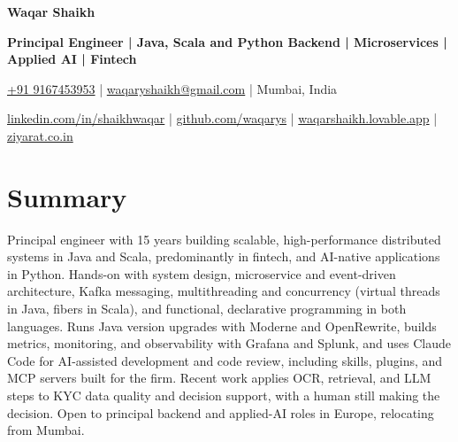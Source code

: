 \documentclass[10pt,a4paper]{article}
\newcommand{\fs}{9.5}\newcommand{\ld}{11.0}
\begin{document}
\raggedright\fontsize{\fs}{\ld}\selectfont

{\fontsize{20}{23}\selectfont\bfseries Waqar Shaikh}\par\vspace{1pt}
{\color{acc}\bfseries Principal Engineer | Java, Scala and Python Backend | Microservices | Applied AI | Fintech}\par
\href{tel:+919167453953}{+91 9167453953} | \href{mailto:waqaryshaikh@gmail.com}{waqaryshaikh@gmail.com} | Mumbai, India\par
\href{https://www.linkedin.com/in/shaikhwaqar}{linkedin.com/in/shaikhwaqar} | \href{https://github.com/waqarys}{github.com/waqarys} | \href{https://waqarshaikh.lovable.app/}{waqarshaikh.lovable.app} | \href{https://ziyarat.co.in}{ziyarat.co.in}\par

\section*{Summary}
Principal engineer with 15 years building scalable, high-performance distributed systems in Java and Scala, predominantly in fintech, and AI-native applications in Python. Hands-on with system design, microservice and event-driven architecture, Kafka messaging, multithreading and concurrency (virtual threads in Java, fibers in Scala), and functional, declarative programming in both languages. Runs Java version upgrades with Moderne and OpenRewrite, builds metrics, monitoring, and observability with Grafana and Splunk, and uses Claude Code for AI-assisted development and code review, including skills, plugins, and MCP servers built for the firm. Recent work applies OCR, retrieval, and LLM steps to KYC data quality and decision support, with a human still making the decision. Open to principal backend and applied-AI roles in Europe, relocating from Mumbai.
\end{document}
